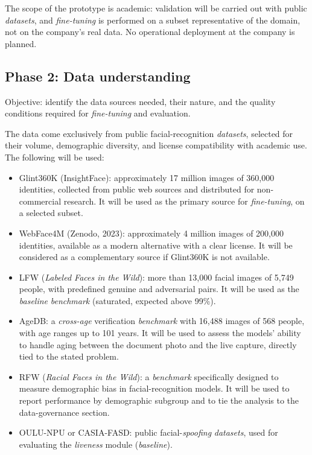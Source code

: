 \documentclass[
  11pt, %
]{charter}
\begin{document}
The scope of the prototype is academic: validation will be carried out with public \textit{datasets}, and \textit{fine-tuning} is performed on a subset representative of the domain, not on the company's real data. No operational deployment at the company is planned.

\subsection{Phase 2: Data understanding}

Objective: identify the data sources needed, their nature, and the quality conditions required for \textit{fine-tuning} and evaluation.

The data come exclusively from public facial-recognition \textit{datasets}, selected for their volume, demographic diversity, and license compatibility with academic use. The following will be used:

\begin{itemize}
  \item Glint360K (InsightFace): approximately 17 million images of 360,000 identities, collected from public web sources and distributed for non-commercial research. It will be used as the primary source for \textit{fine-tuning}, on a selected subset.
  \item WebFace4M (Zenodo, 2023): approximately 4 million images of 200,000 identities, available as a modern alternative with a clear license. It will be considered as a complementary source if Glint360K is not available.
  \item LFW (\textit{Labeled Faces in the Wild}): more than 13,000 facial images of 5,749 people, with predefined genuine and adversarial pairs. It will be used as the \textit{baseline} \textit{benchmark} (saturated, expected above 99\%).
  \item AgeDB: a \textit{cross-age} verification \textit{benchmark} with 16,488 images of 568 people, with age ranges up to 101 years. It will be used to assess the models' ability to handle aging between the document photo and the live capture, directly tied to the stated problem.
  \item RFW (\textit{Racial Faces in the Wild}): a \textit{benchmark} specifically designed to measure demographic bias in facial-recognition models. It will be used to report performance by demographic subgroup and to tie the analysis to the data-governance section.
  \item OULU-NPU or CASIA-FASD: public facial-\textit{spoofing} \textit{datasets}, used for evaluating the \textit{liveness} module (\textit{baseline}).
\end{itemize}
\end{document}
